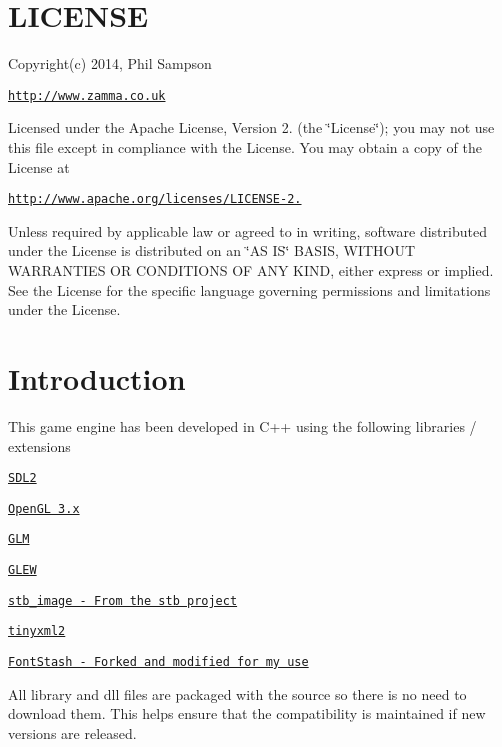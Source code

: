 \hypertarget{index_LICENSE}{}\section{L\+I\+C\+E\+N\+S\+E}\label{index_LICENSE}
Copyright(c) 2014, Phil Sampson

\href{http://www.zamma.co.uk}{\tt http\+://www.\+zamma.\+co.\+uk}

Licensed under the Apache License, Version 2. (the \char`\"{}\+License\char`\"{}); you may not use this file except in compliance with the License. You may obtain a copy of the License at

\href{http://www.apache.org/licenses/LICENSE-2.0}{\tt http\+://www.\+apache.\+org/licenses/\+L\+I\+C\+E\+N\+S\+E-\/2.}

Unless required by applicable law or agreed to in writing, software distributed under the License is distributed on an \char`\"{}\+A\+S I\+S\char`\"{} B\+A\+S\+I\+S, W\+I\+T\+H\+O\+U\+T W\+A\+R\+R\+A\+N\+T\+I\+E\+S O\+R C\+O\+N\+D\+I\+T\+I\+O\+N\+S O\+F A\+N\+Y K\+I\+N\+D, either express or implied. See the License for the specific language governing permissions and limitations under the License.\hypertarget{index_intro_sec}{}\section{Introduction}\label{index_intro_sec}
This game engine has been developed in C++ using the following libraries / extensions


\begin{DoxyItemize}
\item \href{https://www.libsdl.org/index.php}{\tt S\+D\+L2}
\item \href{https://www.opengl.org/}{\tt Open\+G\+L 3.\+x}
\item \href{http://glm.g-truc.net/0.9.6/index.html}{\tt G\+L\+M}
\item \href{http://glew.sourceforge.net/}{\tt G\+L\+E\+W}
\item \href{https://github.com/nothings/stb}{\tt stb\+\_\+image -\/ From the stb project}
\item \href{https://github.com/leethomason/tinyxml2}{\tt tinyxml2}
\item \href{https://github.com/Zammalad/fontstash}{\tt Font\+Stash -\/ Forked and modified for my use}
\end{DoxyItemize}

All library and dll files are packaged with the source so there is no need to download them. This helps ensure that the compatibility is maintained if new versions are released.

